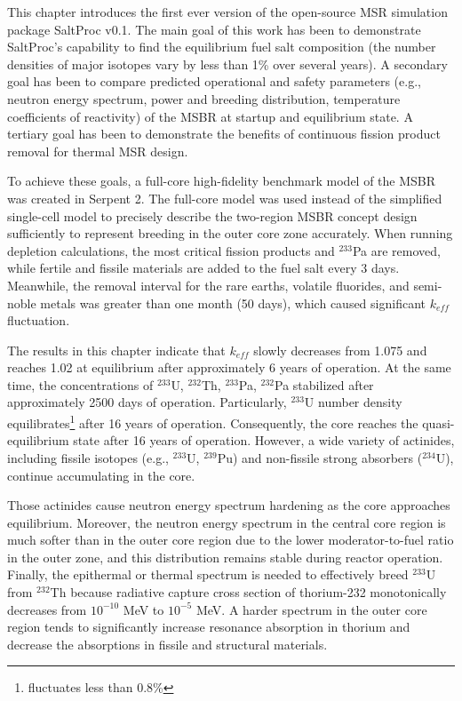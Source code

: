 This chapter introduces the first ever version of the open-source \gls{MSR} 
simulation package SaltProc v0.1. The main goal of this work has been to 
demonstrate SaltProc's capability to find the equilibrium fuel salt 
composition (the number densities of major isotopes vary by less than 1\% over 
several years). A secondary goal has been to compare predicted operational and 
safety parameters (e.g., neutron energy spectrum, power and breeding 
distribution, temperature coefficients of reactivity) of the \gls{MSBR} at 
startup and equilibrium state. A tertiary goal has been to demonstrate the 
benefits of continuous fission product removal for thermal \gls{MSR} design.

To achieve these goals, a full-core high-fidelity benchmark model of the 
\gls{MSBR} was created in Serpent 2. The full-core model was used instead of 
the simplified single-cell model \cite{betzler_molten_2017, 	
rykhlevskii_online_2017, betzler_fuel_2018} to precisely describe the 
two-region \gls{MSBR} concept design sufficiently to represent breeding in the 
outer core zone accurately. When running depletion calculations, the most 
critical fission products and $^{233}$Pa are removed, while fertile and  
fissile materials are added to the fuel salt every 3 days.  Meanwhile, the 
removal interval for the rare earths, volatile fluorides, and semi-noble 
metals was greater than one month (50 days), which caused significant 
$k_{eff}$  
fluctuation. 

The results in this chapter indicate that $k_{eff}$ slowly decreases from 
1.075 and reaches 1.02 at equilibrium after approximately 6 years of 
operation. At the same time, the concentrations of $^{233}$U, $^{232}$Th, 
$^{233}$Pa, $^{232}$Pa stabilized after approximately 2500 days of operation.  
Particularly, $^{233}$U number density equilibrates\footnote{fluctuates less 
than 0.8\%} after 16 years of operation. Consequently, the core reaches the 
quasi-equilibrium state after 16 years of operation. However, a wide variety 
of actinides, including fissile isotopes (e.g., $^{233}$U, $^{239}$Pu) and 
non-fissile strong absorbers ($^{234}$U), continue accumulating in the 
core. 

Those actinides cause neutron energy spectrum hardening as the core  
approaches equilibrium. Moreover, the neutron energy spectrum in the central 
core region is much softer than in the outer core region due to the lower 
moderator-to-fuel ratio in the outer zone, and this distribution remains 
stable during reactor operation. Finally, the epithermal or thermal spectrum 
is needed to effectively breed $^{233}$U from $^{232}$Th because radiative 
capture cross section of thorium-232 monotonically decreases from $10^{-10}$ 
MeV to $10^{-5}$ MeV. A harder spectrum in the outer core region tends to 
significantly increase resonance absorption in thorium and decrease the 
absorptions in fissile and structural materials. 

